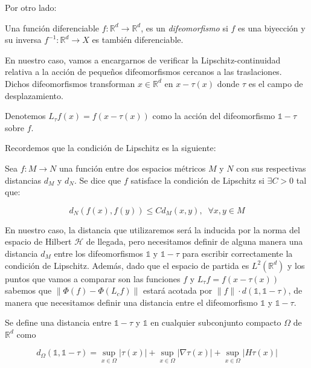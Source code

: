 \noindent Por otro lado: 


\begin{definicion}
  Una función diferenciable $f: \mathbb{R}^d \rightarrow \mathbb{R}^d$, es un \textit{difeomorfismo} si $f$ es una biyección y su inversa $f^{-1}:\mathbb{R}^d \rightarrow X$ es también diferenciable. 
\end{definicion}


\noindent En nuestro caso, vamos a encargarnos de verificar la Lipschitz-continuidad relativa a la acción de pequeños difeomorfismos cercanos a las traslaciones. Dichos difeomorfismos transforman $x \in \mathbb{R}^d$ en $x-\tau (x)$ donde $\tau$ es el campo de desplazamiento. 

\begin{definicion}
Denotemos $L_{\tau} f(x)=f(x-\tau(x))$ como la acción del difeomorfismo $\mathbb{1}-\tau$ sobre $f$.
\end{definicion} 

\medskip

\noindent Recordemos que la condición de Lipschitz es la siguiente: 

\begin{definicion}
  Sea $f: M \rightarrow N$ una función entre dos espacios métricos $M$ y $N$ con sus respectivas distancias $d_M$ y $d_N$. Se dice que $f$ satisface la condición de Lipschitz si $\exists C>0$ tal que: 

  $$d_N(f(x),f(y))\leq C d_M(x,y), \; \; \forall x,y \in M$$
\end{definicion}

\noindent En nuestro caso, la distancia que utilizaremos será la inducida por la norma del espacio de Hilbert $\mathcal{H}$ de llegada, pero necesitamos definir de alguna manera una distancia $d_M$ entre los difeomorfismos $\mathbb{1}$ y $\mathbb{1}-\tau$ para escribir correctamente la condición de Lipschitz. Además, dado que el espacio de partida es $L^2(\mathbb{R}^d)$ y los puntos que vamos a comparar son las funciones $f$ y $L_\tau f=f(x-\tau(x))$ sabemos que $\|\Phi(f) - \Phi(L_cf) \|$ estará acotada por $\|f\| · d(\mathbb{1}, \mathbb{1}-\tau)$, de manera que necesitamos definir una distancia entre el difeomorfismo $\mathbb{1}$ y $\mathbb{1}-\tau$.

\begin{definicion}
Se define una distancia entre $\mathbb{1}-\tau$ y $\mathbb{1}$ en cualquier subconjunto compacto $\Omega$ de $\mathbb{R}^d$ como 

\begin{equation} \label{eq::distancia}
  d_\Omega(\mathbb{1},\mathbb{1}-\tau) = \sup_{x \in \Omega} |\tau (x)| + \sup_{x \in \Omega} |\nabla \tau (x)| + \sup_{x \in \Omega}|H \tau (x)|
\end{equation}

\end{definicion}
\medskip

